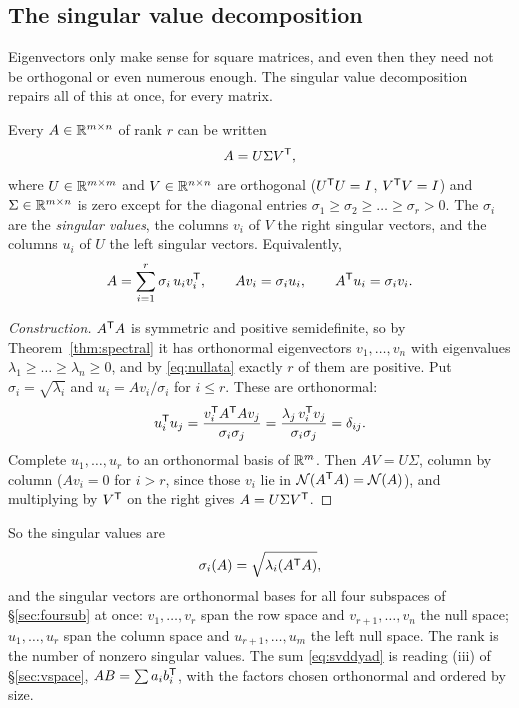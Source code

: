 \documentclass[11pt]{article}
\begin{document}
\subsection{The singular value decomposition}\label{sec:svdthm}
Eigenvectors only make sense for square matrices, and even then they need not be
orthogonal or even numerous enough. The singular value decomposition repairs all of
this at once, for every matrix.
\begin{theorem}[SVD]\label{thm:svd}
Every $A\in\mathbb{R}^{m\times n}$ of rank $r$ can be written
\[
   A = U\Sigma V^{\mathsf{T}} ,
\]
where $U\in\mathbb{R}^{m\times m}$ and $V\in\mathbb{R}^{n\times n}$ are orthogonal ($U^{\mathsf{T}} U=I$,
$V^{\mathsf{T}} V=I$) and $\Sigma\in\mathbb{R}^{m\times n}$ is zero except for the diagonal entries
$\sigma_1\ge\sigma_2\ge\dots\ge\sigma_r>0$. The $\sigma_i$ are the \emph{singular
values}, the columns $v_i$ of $V$ the right singular vectors, and the columns $u_i$
of $U$ the left singular vectors. Equivalently,
\begin{equation}\label{eq:svddyad}
   A = \sum_{i=1}^{r}\sigma_i\,u_iv_i^{\mathsf{T}} ,\qquad Av_i=\sigma_iu_i,\qquad A^{\mathsf{T}} u_i=\sigma_iv_i .
\end{equation}
\end{theorem}
\begin{proof}[Construction]
$A^{\mathsf{T}} A$ is symmetric and positive semidefinite, so by
Theorem~\ref{thm:spectral} it has orthonormal eigenvectors $v_1,\dots,v_n$ with
eigenvalues $\lambda_1\ge\dots\ge\lambda_n\ge0$, and by \eqref{eq:nullata}
exactly $r$ of them are positive. Put $\sigma_i=\sqrt{\lambda_i}$ and
$u_i=Av_i/\sigma_i$ for $i\le r$. These are orthonormal:
\[
   u_i^{\mathsf{T}} u_j=\frac{v_i^{\mathsf{T}} A^{\mathsf{T}} Av_j}{\sigma_i\sigma_j}
            =\frac{\lambda_j\,v_i^{\mathsf{T}} v_j}{\sigma_i\sigma_j}=\delta_{ij}.
\]
Complete $u_1,\dots,u_r$ to an orthonormal basis of $\mathbb{R}^{m}$. Then $AV=U\Sigma$,
column by column ($Av_i=0$ for $i>r$, since those $v_i$ lie in
$\mathcal N(A^{\mathsf{T}} A)=\mathcal N(A)$), and multiplying by $V^{\mathsf{T}}$ on the right gives
$A=U\Sigma V^{\mathsf{T}}$.
\end{proof}
So the singular values are
\[
   \sigma_i(A) = \sqrt{\lambda_i(A^{\mathsf{T}} A)} ,
\]
and the singular vectors are orthonormal bases for all four subspaces of
\S\ref{sec:foursub} at once: $v_1,\dots,v_r$ span the row space and
$v_{r+1},\dots,v_n$ the null space; $u_1,\dots,u_r$ span the column space and
$u_{r+1},\dots,u_m$ the left null space. The rank is the number of nonzero
singular values. The sum \eqref{eq:svddyad} is reading (iii) of \S\ref{sec:vspace},
$AB=\sum a_ib_i^{\mathsf{T}}$, with the factors chosen orthonormal and ordered by size.
\end{document}
